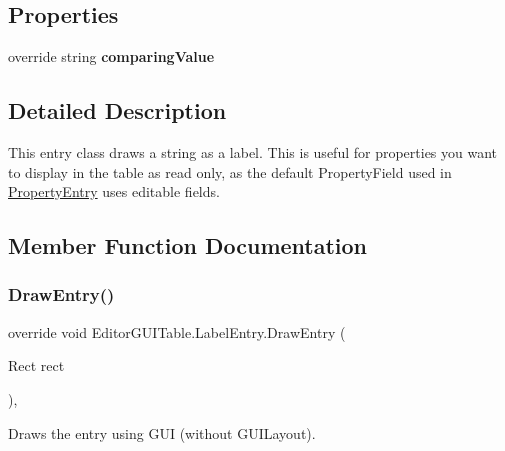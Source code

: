 \subsection*{Properties}
\begin{DoxyCompactItemize}
\item 
\mbox{\label{class_editor_g_u_i_table_1_1_label_entry_aea2a985feca1a1f17efefd707b67030c}} 
override string {\bfseries comparing\+Value}
\end{DoxyCompactItemize}


\subsection{Detailed Description}
This entry class draws a string as a label. This is useful for properties you want to display in the table as read only, as the default Property\+Field used in \mbox{\hyperlink{class_editor_g_u_i_table_1_1_property_entry}{Property\+Entry}} uses editable fields. 



\subsection{Member Function Documentation}
\mbox{\label{class_editor_g_u_i_table_1_1_label_entry_a94247717318efb4e51347519e0b985dc}} 
\subsubsection{\texorpdfstring{Draw\+Entry()}{DrawEntry()}}
{\footnotesize\ttfamily override void Editor\+G\+U\+I\+Table.\+Label\+Entry.\+Draw\+Entry (\begin{DoxyParamCaption}\item[{Rect}]{rect }\end{DoxyParamCaption})\hspace{0.3cm}{\ttfamily [inline]}, {\ttfamily [virtual]}}



Draws the entry using G\+UI (without G\+U\+I\+Layout). 


